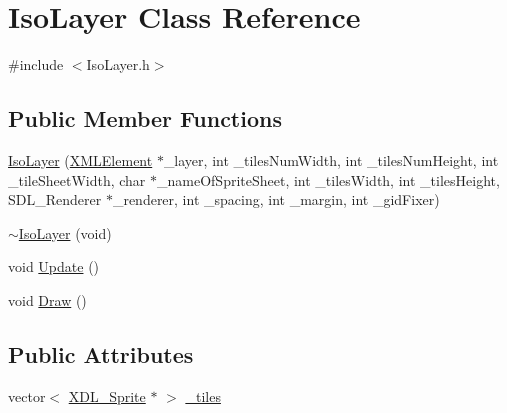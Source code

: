 \hypertarget{class_iso_layer}{\section{Iso\-Layer Class Reference}
\label{class_iso_layer}
}


{\ttfamily \#include $<$Iso\-Layer.\-h$>$}

\subsection*{Public Member Functions}
\begin{DoxyCompactItemize}
\item 
\hyperlink{class_iso_layer_a37dab3b9120d6ffce8a9e7ee61ddba00}{Iso\-Layer} (\hyperlink{classtinyxml2_1_1_x_m_l_element}{X\-M\-L\-Element} $\ast$\-\_\-layer, int \-\_\-tiles\-Num\-Width, int \-\_\-tiles\-Num\-Height, int \-\_\-tile\-Sheet\-Width, char $\ast$\-\_\-name\-Of\-Sprite\-Sheet, int \-\_\-tiles\-Width, int \-\_\-tiles\-Height, S\-D\-L\-\_\-\-Renderer $\ast$\-\_\-renderer, int \-\_\-spacing, int \-\_\-margin, int \-\_\-gid\-Fixer)
\item 
\hyperlink{class_iso_layer_a5fe18022f5cf3cd49718fa52a0a239ba}{$\sim$\-Iso\-Layer} (void)
\item 
void \hyperlink{class_iso_layer_a10856b4ee71ec47c70bdb88ba99f3577}{Update} ()
\item 
void \hyperlink{class_iso_layer_afb67093891aaf8185de5ce1f5c9fb4b7}{Draw} ()
\end{DoxyCompactItemize}
\subsection*{Public Attributes}
\begin{DoxyCompactItemize}
\item 
vector$<$ \hyperlink{class_x_d_l___sprite}{X\-D\-L\-\_\-\-Sprite} $\ast$ $>$ \hyperlink{class_iso_layer_a4174fb6589bb484bb97f670665e56172}{\-\_\-tiles}
\end{DoxyCompactItemize}


